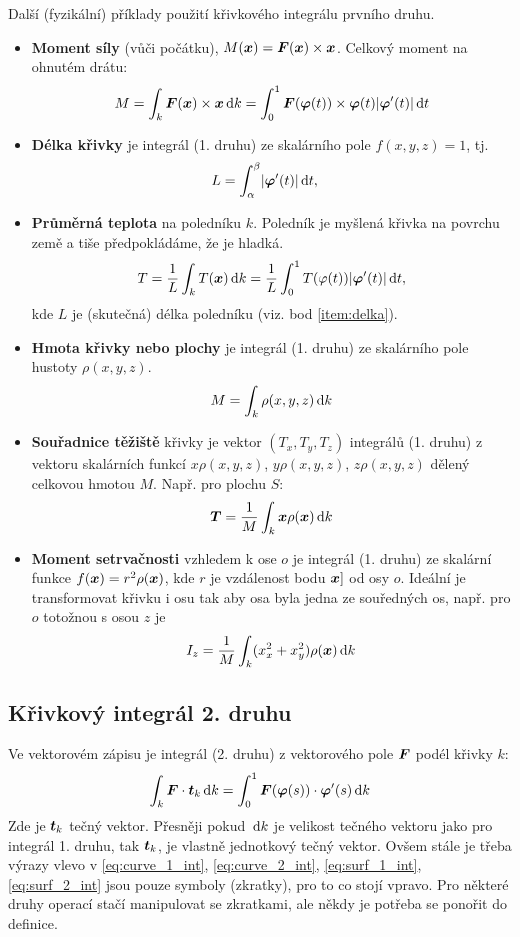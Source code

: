 Další (fyzikální) příklady použití křivkového integrálu prvního druhu.
\begin{itemize}
 \item {\bf Moment síly} (vůči počátku), $M(\mathbf{\boldsymbol{x}}) = \mathbf{\boldsymbol{F}}(\mathbf{\boldsymbol{x}}) \times \mathbf{\boldsymbol{x}}$. Celkový moment na ohnutém drátu:
 \[
    M = \int_k \mathbf{\boldsymbol{F}}(\mathbf{\boldsymbol{x}})\times \mathbf{\boldsymbol{x}} \,{\rm d} k = \int_0^1 \mathbf{\boldsymbol{F}}(\mathbf{\boldsymbol{\varphi}}(t))\times \mathbf{\boldsymbol{\varphi}}(t) \lvert\mathbf{\boldsymbol{\varphi}}'(t)\rvert \,{\rm d} t
 \]
 \item \label{item:delka} {\bf Délka křivky} je integrál (1. druhu) ze skalárního pole $f(x,y,z)=1$, tj.
\[
   L=\int_\alpha^\beta \lvert\mathbf{\boldsymbol{\varphi}}'(t)\rvert \,{\rm d}{t},\quad 
\]
 \item {\bf Průměrná teplota} na poledníku $k$. Poledník je myšlená křivka na povrchu země a tiše předpokládáme, že je hladká.
 \[
    T = \frac{1}{L}\int_k T(\mathbf{\boldsymbol{x}}) \,{\rm d} k = \frac{1}{L}\int_0^1 T(\varphi(t)) \lvert\mathbf{\boldsymbol{\varphi}}'(t)\rvert \,{\rm d} t,
 \]
 kde $L$ je (skutečná) délka poledníku (viz. bod \ref{item:delka}).
 \item {\bf Hmota křivky nebo plochy} je integrál (1. druhu) ze skalárního pole hustoty $\rho(x,y,z)$.
\[
        M=\int_k \rho(x,y,z) \,{\rm d} k
\]
\item {\bf Souřadnice těžiště} křivky je vektor $(T_x,T_y,T_z)$ integrálů (1. druhu) z vektoru skalárních funkcí 
       $x\rho(x,y,z)$, $ y \rho(x,y,z)$, $z\rho(x,y,z)$ dělený celkovou hmotou $M$. Např. pro plochu $S$:
\[
        \mathbf{\boldsymbol{T}}=\frac{1}{M} \int_k \mathbf{\boldsymbol{x}} \rho(\mathbf{\boldsymbol{x}}) \,{\rm d} k
\]

\item {\bf Moment setrvačnosti} vzhledem k ose $o$ je integrál (1. druhu) ze skalární funkce
$f(\mathbf{\boldsymbol{x}})=r^2\rho(\mathbf{\boldsymbol{x}})$, kde $r$ je vzdálenost bodu $\mathbf{\boldsymbol{x}}]$ od osy $o$. Ideální je transformovat křivku i osu tak aby osa 
byla jedna ze souředných os, např. pro $o$ totožnou s osou $z$ je
\[
    I_z = \frac{1}{M} \int_k (x_x^2 + x_y^2) \rho(\mathbf{\boldsymbol{x}}) \,{\rm d} k
\]




\end{itemize}


\subsection{Křivkový integrál 2. druhu}
Ve vektorovém zápisu je integrál (2. druhu) z vektorového pole $\mathbf{\boldsymbol{F}}$ podél křivky $k$:
\begin{equation}
\label{eq:curve_2_int}
 \int_k \mathbf{\boldsymbol{F}} \cdot \mathbf{\boldsymbol{t}}_k \,{\rm d} k = \int_0^1 \mathbf{\boldsymbol{F}}( \mathbf{\boldsymbol{\varphi}}(s) ) \cdot \mathbf{\boldsymbol{\varphi}}'(s) \,{\rm d} k
\end{equation}
Zde je $\mathbf{\boldsymbol{t}}_k$ tečný vektor. Přesněji pokud $\,{\rm d} k$ je velikost tečného vektoru jako pro integrál 1. druhu, tak $\mathbf{\boldsymbol{t}}_k$, je vlastně jednotkový tečný vektor.
Ovšem stále je třeba výrazy vlevo v \eqref{eq:curve_1_int}, \eqref{eq:curve_2_int}, \eqref{eq:surf_1_int}, \eqref{eq:surf_2_int} jsou pouze symboly (zkratky), 
pro to co stojí vpravo. Pro některé druhy operací stačí manipulovat se zkratkami, ale někdy je potřeba se ponořit do definice.

